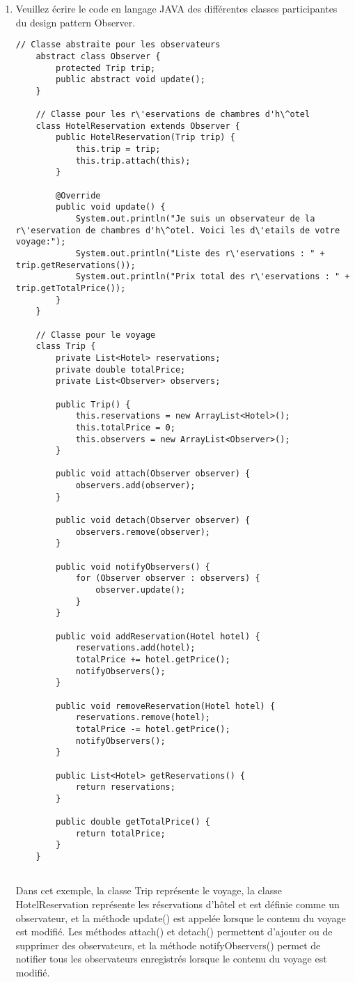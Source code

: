 \begin{enumerate}
\item Veuillez écrire le code en langage JAVA des différentes classes participantes du design pattern Observer.
\begin{lstlisting}[style=monstyle]
	// Classe abstraite pour les observateurs
	abstract class Observer {
		protected Trip trip;
		public abstract void update();
	}
	
	// Classe pour les r\'eservations de chambres d'h\^otel
	class HotelReservation extends Observer {
		public HotelReservation(Trip trip) {
			this.trip = trip;
			this.trip.attach(this);
		}
		
		@Override
		public void update() {
			System.out.println("Je suis un observateur de la r\'eservation de chambres d'h\^otel. Voici les d\'etails de votre voyage:");
			System.out.println("Liste des r\'eservations : " + trip.getReservations());
			System.out.println("Prix total des r\'eservations : " + trip.getTotalPrice());
		}
	}
	
	// Classe pour le voyage
	class Trip {
		private List<Hotel> reservations;
		private double totalPrice;
		private List<Observer> observers;
		
		public Trip() {
			this.reservations = new ArrayList<Hotel>();
			this.totalPrice = 0;
			this.observers = new ArrayList<Observer>();
		}
		
		public void attach(Observer observer) {
			observers.add(observer);
		}
		
		public void detach(Observer observer) {
			observers.remove(observer);
		}
		
		public void notifyObservers() {
			for (Observer observer : observers) {
				observer.update();
			}
		}
		
		public void addReservation(Hotel hotel) {
			reservations.add(hotel);
			totalPrice += hotel.getPrice();
			notifyObservers();
		}
		
		public void removeReservation(Hotel hotel) {
			reservations.remove(hotel);
			totalPrice -= hotel.getPrice();
			notifyObservers();
		}
		
		public List<Hotel> getReservations() {
			return reservations;
		}
		
		public double getTotalPrice() {
			return totalPrice;
		}
	}
	
\end{lstlisting}
Dans cet exemple, la classe Trip représente le voyage, la classe HotelReservation représente les réservations d'hôtel et est définie comme un observateur, et la méthode update() est appelée lorsque le contenu du voyage est modifié. Les méthodes attach() et detach() permettent d'ajouter ou de supprimer des observateurs, et la méthode notifyObservers() permet de notifier tous les observateurs enregistrés lorsque le contenu du voyage est modifié.

\end{enumerate}